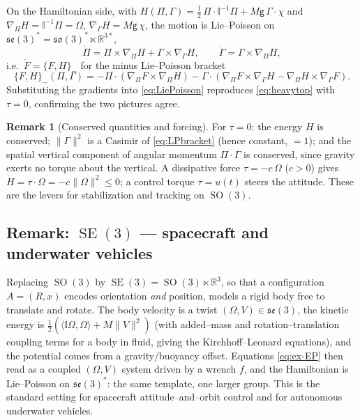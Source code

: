 \documentclass[11pt]{article}
\theoremstyle{definition}
\newtheorem{remark}[definition]{Remark}
\theoremstyle{plain}
\newcommand{\inner}[2]{\langle #1, #2\rangle}
\newcommand{\norm}[1]{\lVert #1 \rVert}
\newcommand{\so}{\mathfrak{so}}
\newcommand{\se}{\mathfrak{se}}
\newcommand{\grav}{\mathsf{g}}
\newcommand{\Inertia}{\mathbb{I}}
\DeclareMathOperator{\SO}{SO}
\DeclareMathOperator{\SE}{SE}
\begin{document}
On the Hamiltonian side, with $H(\Pi,\Gamma)=\tfrac12\,\Pi\cdot\Inertia^{-1}\Pi
+M\grav\,\Gamma\cdot\chi$ and $\nabla_{\Pi}H=\Inertia^{-1}\Pi=\Omega$,
$\nabla_{\Gamma}H=M\grav\,\chi$, the motion is Lie--Poisson on
$\se(3)^{*}=\so(3)^{*}\ltimes\mathbb{R}^{3*}$,
\begin{equation}\label{eq:LiePoisson}
  \dot\Pi=\Pi\times\nabla_{\Pi}H+\Gamma\times\nabla_{\Gamma}H,
  \qquad
  \dot\Gamma=\Gamma\times\nabla_{\Pi}H ,
\end{equation}
i.e.\ $\dot F=\{F,H\}_{-}$ for the minus Lie--Poisson bracket
\begin{equation}\label{eq:LPbracket}
  \{F,H\}_{-}(\Pi,\Gamma)
  =-\Pi\cdot(\nabla_{\Pi}F\times\nabla_{\Pi}H)
   -\Gamma\cdot(\nabla_{\Pi}F\times\nabla_{\Gamma}H-\nabla_{\Pi}H\times\nabla_{\Gamma}F).
\end{equation}
Substituting the gradients into \eqref{eq:LiePoisson} reproduces \eqref{eq:heavytop} with
$\tau=0$, confirming the two pictures agree.

\begin{remark}[Conserved quantities and forcing]\label{rem:conserved}
For $\tau=0$: the energy $H$ is conserved; $\norm{\Gamma}^{2}$ is a Casimir of
\eqref{eq:LPbracket} (hence constant, $=1$); and the spatial vertical component of angular
momentum $\Pi\cdot\Gamma$ is conserved, since gravity exerts no torque about the vertical.
A dissipative force $\tau=-c\,\Omega$ ($c>0$) gives $\dot H=\tau\cdot\Omega=-c\norm{\Omega}^{2}\le0$;
a control torque $\tau=u(t)$ steers the attitude. These are the levers for stabilization
and tracking on $\SO(3)$.
\end{remark}

\subsection{Remark: $\SE(3)$ --- spacecraft and underwater vehicles}
\label{ss:se3}

Replacing $\SO(3)$ by $\SE(3)=\SO(3)\ltimes\mathbb{R}^{3}$, so that a configuration
$A=(R,x)$ encodes orientation \emph{and} position, models a rigid body free to translate and
rotate. The body velocity is a twist $(\Omega,V)\in\se(3)$, the kinetic energy is
$\tfrac12(\inner{\Inertia\Omega}{\Omega}+M\norm{V}^{2})$ (with added--mass and rotation--translation
coupling terms for a body in fluid, giving the Kirchhoff--Leonard equations), and the
potential comes from a gravity/buoyancy offset. Equations \eqref{eq:ex-EP} then read as a
coupled $(\Omega,V)$ system driven by a wrench $f$, and the Hamiltonian is Lie--Poisson on
$\se(3)^{*}$: the same template, one larger group. This is the standard setting for
spacecraft attitude--and--orbit control and for autonomous underwater vehicles.
\end{document}
